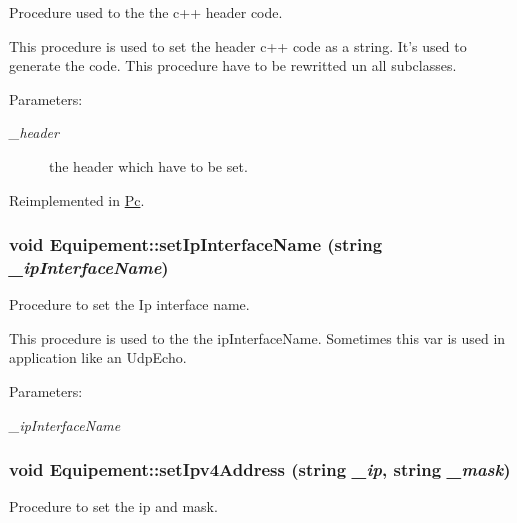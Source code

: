 Procedure used to the the c++ header code. 

This procedure is used to set the header c++ code as a string. It's used to generate the code. This procedure have to be rewritted un all subclasses.

\begin{Desc}
\item[Parameters:]
\begin{description}
\item[{\em \_\-header}]the header which have to be set. \end{description}
\end{Desc}


Reimplemented in \hyperlink{class_pc_45386d5f2837f3d2087fe62ca1692883}{Pc}.\hypertarget{class_equipement_a73b74eda1a7305f94a66611e2b50866}{
\subsubsection[{setIpInterfaceName}]{\setlength{\rightskip}{0pt plus 5cm}void Equipement::setIpInterfaceName (string {\em \_\-ipInterfaceName})}}
\label{class_equipement_a73b74eda1a7305f94a66611e2b50866}


Procedure to set the Ip interface name. 

This procedure is used to the the ipInterfaceName. Sometimes this var is used in application like an UdpEcho.

\begin{Desc}
\item[Parameters:]
\begin{description}
\item[{\em \_\-ipInterfaceName}]\end{description}
\end{Desc}
\hypertarget{class_equipement_8ad1b79f648fa6917cff0df9ab8d9240}{
\subsubsection[{setIpv4Address}]{\setlength{\rightskip}{0pt plus 5cm}void Equipement::setIpv4Address (string {\em \_\-ip}, \/  string {\em \_\-mask})}}
\label{class_equipement_8ad1b79f648fa6917cff0df9ab8d9240}


Procedure to set the ip and mask. 

